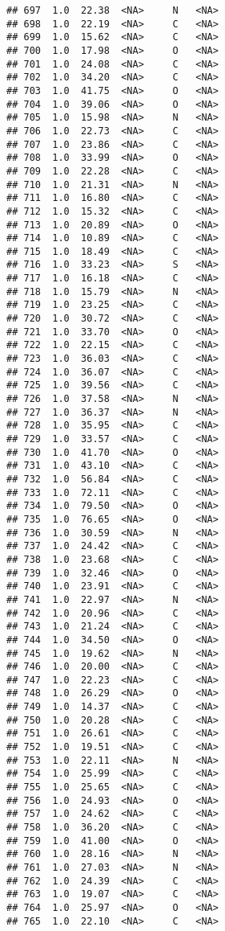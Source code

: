 \documentclass[
]{article}
\begin{document}
\begin{verbatim}
## 697  1.0  22.38  <NA>     N   <NA>
## 698  1.0  22.19  <NA>     C   <NA>
## 699  1.0  15.62  <NA>     C   <NA>
## 700  1.0  17.98  <NA>     O   <NA>
## 701  1.0  24.08  <NA>     C   <NA>
## 702  1.0  34.20  <NA>     C   <NA>
## 703  1.0  41.75  <NA>     O   <NA>
## 704  1.0  39.06  <NA>     O   <NA>
## 705  1.0  15.98  <NA>     N   <NA>
## 706  1.0  22.73  <NA>     C   <NA>
## 707  1.0  23.86  <NA>     C   <NA>
## 708  1.0  33.99  <NA>     O   <NA>
## 709  1.0  22.28  <NA>     C   <NA>
## 710  1.0  21.31  <NA>     N   <NA>
## 711  1.0  16.80  <NA>     C   <NA>
## 712  1.0  15.32  <NA>     C   <NA>
## 713  1.0  20.89  <NA>     O   <NA>
## 714  1.0  10.89  <NA>     C   <NA>
## 715  1.0  18.49  <NA>     C   <NA>
## 716  1.0  33.23  <NA>     S   <NA>
## 717  1.0  16.18  <NA>     C   <NA>
## 718  1.0  15.79  <NA>     N   <NA>
## 719  1.0  23.25  <NA>     C   <NA>
## 720  1.0  30.72  <NA>     C   <NA>
## 721  1.0  33.70  <NA>     O   <NA>
## 722  1.0  22.15  <NA>     C   <NA>
## 723  1.0  36.03  <NA>     C   <NA>
## 724  1.0  36.07  <NA>     C   <NA>
## 725  1.0  39.56  <NA>     C   <NA>
## 726  1.0  37.58  <NA>     N   <NA>
## 727  1.0  36.37  <NA>     N   <NA>
## 728  1.0  35.95  <NA>     C   <NA>
## 729  1.0  33.57  <NA>     C   <NA>
## 730  1.0  41.70  <NA>     O   <NA>
## 731  1.0  43.10  <NA>     C   <NA>
## 732  1.0  56.84  <NA>     C   <NA>
## 733  1.0  72.11  <NA>     C   <NA>
## 734  1.0  79.50  <NA>     O   <NA>
## 735  1.0  76.65  <NA>     O   <NA>
## 736  1.0  30.59  <NA>     N   <NA>
## 737  1.0  24.42  <NA>     C   <NA>
## 738  1.0  23.68  <NA>     C   <NA>
## 739  1.0  32.46  <NA>     O   <NA>
## 740  1.0  23.91  <NA>     C   <NA>
## 741  1.0  22.97  <NA>     N   <NA>
## 742  1.0  20.96  <NA>     C   <NA>
## 743  1.0  21.24  <NA>     C   <NA>
## 744  1.0  34.50  <NA>     O   <NA>
## 745  1.0  19.62  <NA>     N   <NA>
## 746  1.0  20.00  <NA>     C   <NA>
## 747  1.0  22.23  <NA>     C   <NA>
## 748  1.0  26.29  <NA>     O   <NA>
## 749  1.0  14.37  <NA>     C   <NA>
## 750  1.0  20.28  <NA>     C   <NA>
## 751  1.0  26.61  <NA>     C   <NA>
## 752  1.0  19.51  <NA>     C   <NA>
## 753  1.0  22.11  <NA>     N   <NA>
## 754  1.0  25.99  <NA>     C   <NA>
## 755  1.0  25.65  <NA>     C   <NA>
## 756  1.0  24.93  <NA>     O   <NA>
## 757  1.0  24.62  <NA>     C   <NA>
## 758  1.0  36.20  <NA>     C   <NA>
## 759  1.0  41.00  <NA>     O   <NA>
## 760  1.0  28.16  <NA>     N   <NA>
## 761  1.0  27.03  <NA>     N   <NA>
## 762  1.0  24.39  <NA>     C   <NA>
## 763  1.0  19.07  <NA>     C   <NA>
## 764  1.0  25.97  <NA>     O   <NA>
## 765  1.0  22.10  <NA>     C   <NA>

\end{verbatim}
\end{document}
